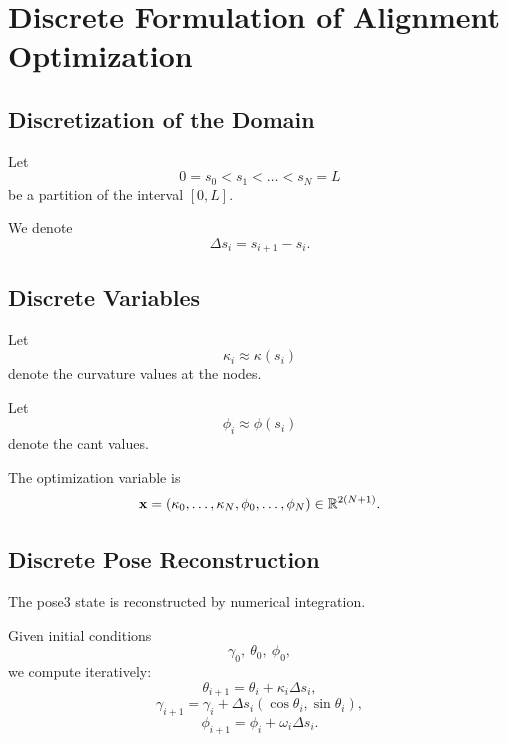 
\section{Discrete Formulation of Alignment Optimization}

\subsection{Discretization of the Domain}

\begin{definition}[Discretization]
Let
\[
0 = s_0 < s_1 < \dots < s_N = L
\]
be a partition of the interval \([0,L]\).
\end{definition}

We denote
\[
\Delta s_i = s_{i+1} - s_i.
\]

\subsection{Discrete Variables}

\begin{definition}
Let
\[
\kappa_i \approx \kappa(s_i)
\]
denote the curvature values at the nodes.
\end{definition}

\begin{definition}
Let
\[
\phi_i \approx \phi(s_i)
\]
denote the cant values.
\end{definition}

\begin{definition}
The optimization variable is
\[
\mathbf{x}
=
(\kappa_0,\dots,\kappa_N,\phi_0,\dots,\phi_N) \in \mathbb{R}^{2(N+1)}.
\]
\end{definition}

\subsection{Discrete Pose Reconstruction}

The pose3 state is reconstructed by numerical integration.

\begin{definition}
Given initial conditions
\[
\gamma_0,\ \theta_0,\ \phi_0,
\]
we compute iteratively:
\[
\theta_{i+1} = \theta_i + \kappa_i \Delta s_i,
\]
\[
\gamma_{i+1} = \gamma_i + \Delta s_i
(\cos\theta_i,\sin\theta_i),
\]
\[
\phi_{i+1} = \phi_i + \omega_i \Delta s_i.
\]
\end{definition}

